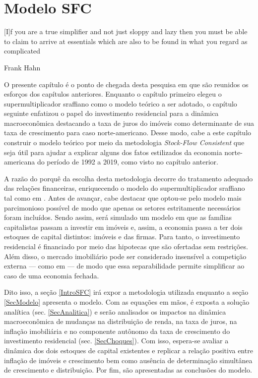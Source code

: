 \chapter{Modelo SFC}\label{CapModelo}

\epigraph{[I]f you are a true simplifier and not just
sloppy and lazy then you must be able to claim to arrive at essentials which are also to be
found in what you regard as complicated}{Frank Hahn}

O presente capítulo é o ponto de chegada desta pesquisa em que são reunidos os esforços dos capítulos anteriores. Enquanto o capítulo primeiro elegeu o supermultiplicador sraffiano como o modelo teórico a ser adotado, o capítulo seguinte  enfatizou o papel do investimento residencial para a dinâmica macroeconômica destacando a taxa de juros do imóveis como determinante de sua taxa de crescimento para caso norte-americano. Desse modo, cabe a este capítulo construir o modelo teórico por meio da metodologia \textit{Stock-Flow Consistent}  que seja útil para ajudar a explicar alguns dos fatos estilizados da economia norte-americana do período de 1992 a 2019, como visto no capítulo anterior.

A razão do porquê da escolha desta metodologia decorre do tratamento adequado das relações financeiras, enriquecendo o modelo do supermultiplicador sraffiano tal como em \textcite{brochier_supermultiplier_2018}. Antes de avançar, cabe destacar que optou-se pelo modelo mais parcimonioso possível de modo que apenas os setores estritamente necessários foram incluídos. Sendo assim, será simulado um modelo em que as famílias capitalistas passam a investir em imóveis e, assim, a economia passa a ter dois estoques de capital distintos: imóveis e das firmas. Para tanto, o investimento residencial é financiado por meio das hipotecas que são ofertadas sem restrições. 
Além disso, o mercado imobiliário pode ser considerado insensível a competição externa --- como em \textcite{duesenberry_investment_1958} --- de modo que essa separabilidade permite simplificar ao caso de uma economia fechada.


Dito isso, a seção \ref{IntroSFC} irá expor a metodologia utilizada enquanto a seção \ref{SecModelo} apresenta o modelo. Com as equações em mãos, é exposta a solução analítica (sec. \ref{SecAnalitica}) e serão analisados os impactos na dinâmica macroeconômica de mudanças na distribuição de renda, na taxa de juros, na inflação imobiliária e no componente autônomo da taxa de crescimento do investimento residencial (sec. \ref{SecChoques}). Com isso, espera-se avaliar a dinâmica dos dois estoques de capital existentes e replicar a relação positiva entre inflação de imóveis e crescimento bem como ausência de determinação simultânea de crescimento e distribuição.
Por fim, são apresentadas as conclusões do modelo.






